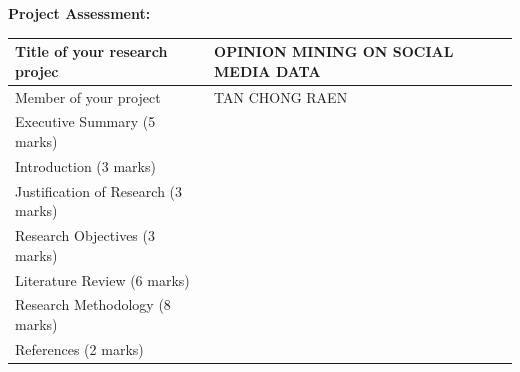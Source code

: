 \documentclass[a4paper,12pt]{article}
\begin{document}
\begin{flushleft}
\textbf{Project Assessment: }
\\
\begin{tabular}{|m{60mm} | m{90mm} |}
\hline
Title of your research projec & OPINION MINING ON SOCIAL MEDIA DATA \\
\hline
Member of your project & TAN CHONG RAEN\\
\hline
Executive Summary (5 marks) & \\
\hline
Introduction (3 marks)& \\
\hline
Justification of Research (3 marks) & \\
\hline
Research Objectives (3 marks)& \\
\hline
Literature Review  (6 marks)& \\
\hline
Research Methodology  (8 marks) & \\
\hline
References (2 marks)& \\
\hline
\end{tabular}
\end{flushleft}
\end{document}
